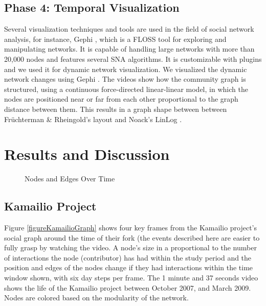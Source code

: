\documentclass[conference]{IEEEtran}
\begin{document}
\subsection{Phase 4: Temporal Visualization}
Several visualization techniques and tools are used in the field of social network analysis, for instance, Gephi \cite{Bastian}, which is a FLOSS tool for exploring and manipulating networks. It is capable of handling large networks with more than 20,000 nodes and features several SNA algorithms. It is customizable with plugins and we used it for dynamic network visualization.
We visualized the dynamic network changes using Gephi \cite{Bastian}. The videos show how the community graph is structured, using a continuous force-directed linear-linear model, in which the nodes are positioned near or far from each other proportional to the graph distance between them. This results in a graph shape between between Fr\"{u}chterman \& Rheingold's \cite{Fruchterman} layout and Noack's LinLog \cite{Noack}.\\
\section{Results and Discussion}
\label{results}

\begin{figure}[!Htbp]
\centering
{}
\caption{Nodes and Edges Over Time}
\label{figureNodesEdgesTimeR}
\end{figure}


\subsection{Kamailio Project}
Figure \ref{figureKamailioGraph} shows four key frames from the Kamailio project's social graph around the time of their fork (the events described here are easier to fully grasp by watching the video. A node's size in a proportional to the number of interactions the node (contributor) has had within the study period and the position and edges of the nodes change if they had interactions within the time window shown, with six day steps per frame. The 1 minute and 37 seconds video shows the life of the Kamailio project between October 2007, and March 2009. Nodes are colored based on the modularity of the network. \\
\end{document}
